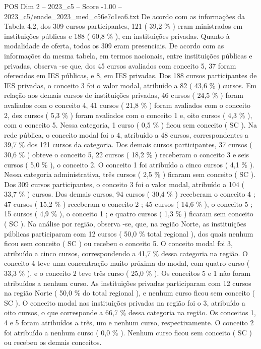 \begin{textsample}{POS Dim 2 – 2023\_c5 – Score -1.00 – 2023\_c5/enade\_2023\_med\_c56e7c1ea6.txt}
De acordo com as informações da Tabela 4.2, dos 309 cursos participantes, 121 ( 39,2 \% ) eram ministrados em instituições públicas e 188 ( 60,8 \% ), em instituições privadas.
Quanto à modalidade de oferta, todos os 309 eram presenciais.
De acordo com as informações da mesma tabela, em termos nacionais, entre instituições públicas e privadas, observa -se que, dos 45 cursos avaliados com conceito 5, 37 foram oferecidos em IES públicas, e 8, em IES privadas.
Dos 188 cursos participantes de IES privadas, o conceito 3 foi o valor modal, atribuído a 82 ( 43,6 \% ) cursos.
Em relação aos demais cursos de instituições privadas, 46 cursos ( 24,5 \% ) foram avaliados com o conceito 4, 41 cursos ( 21,8 \% ) foram avaliados com o conceito 2, dez cursos ( 5,3 \% ) foram avaliados com o conceito 1 e, oito cursos ( 4,3 \% ), com o conceito 5.
Nessa categoria, 1 curso ( 0,5 \% ) ficou sem conceito ( SC ).
Na rede pública, o conceito modal foi o 4, atribuído a 48 cursos, correspondentes a 39,7 \% dos 121 cursos da categoria.
Dos demais cursos participantes, 37 cursos ( 30,6 \% ) obteve o conceito 5, 22 cursos ( 18,2 \% ) receberam o conceito 3 e seis cursos ( 5,0 \% ), o conceito 2.
O conceito 1 foi atribuído a cinco cursos ( 4,1 \% ).
Nessa categoria administrativa, três cursos ( 2,5 \% ) ficaram sem conceito ( SC ).
Dos 309 cursos participantes, o conceito 3 foi o valor modal, atribuído a 104 ( 33,7 \% ) cursos.
Dos demais cursos, 94 cursos ( 30,4 \% ) receberam o conceito 4 ; 47 cursos ( 15,2 \% ) receberam o conceito 2 ; 45 cursos ( 14,6 \% ), o conceito 5 ; 15 cursos ( 4,9 \% ), o conceito 1 ; e quatro cursos ( 1,3 \% ) ficaram sem conceito ( SC ).
Na análise por região, observa -se, que, na região Norte, as instituições públicas participaram com 12 cursos ( 50,0 \% total regional ), dos quais nenhum ficou sem conceito ( SC ) ou recebeu o conceito 5.
O conceito modal foi 3, atribuído a cinco cursos, correspondendo a 41,7 \% dessa categoria na região.
O conceito 4 teve uma concentração muito próxima do modal, com quatro curso ( 33,3 \% ), e o conceito 2 teve três curso ( 25,0 \% ).
Os conceitos 5 e 1 não foram atribuídos a nenhum curso.
As instituições privadas participaram com 12 cursos na região Norte ( 50,0 \% do total regional ), e nenhum curso ficou sem conceito ( SC ).
O conceito modal nas instituições privadas na região foi o 3, atribuído a oito cursos, o que corresponde a 66,7 \% dessa categoria na região.
Os conceitos 1, 4 e 5 foram atribuídos a três, um e nenhum curso, respectivamente.
O conceito 2 foi atribuído a nenhum curso ( 0,0 \% ).
Nenhum curso ficou sem conceito ( SC ) ou recebeu os demais conceitos.

\end{textsample}
